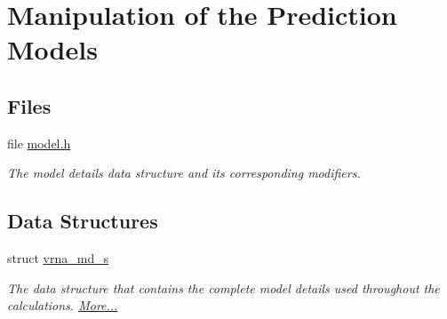 \hypertarget{group__model__details}{\section{Manipulation of the Prediction Models}
\label{group__model__details}
}
\subsection*{Files}
\begin{DoxyCompactItemize}
\item 
file \hyperlink{model_8h}{model.\-h}
\begin{DoxyCompactList}\small\item\em The model details data structure and its corresponding modifiers. \end{DoxyCompactList}\end{DoxyCompactItemize}
\subsection*{Data Structures}
\begin{DoxyCompactItemize}
\item 
struct \hyperlink{group__model__details_structvrna__md__s}{vrna\-\_\-md\-\_\-s}
\begin{DoxyCompactList}\small\item\em The data structure that contains the complete model details used throughout the calculations.  \hyperlink{group__model__details_structvrna__md__s}{More...}\end{DoxyCompactList}\end{DoxyCompactItemize}
